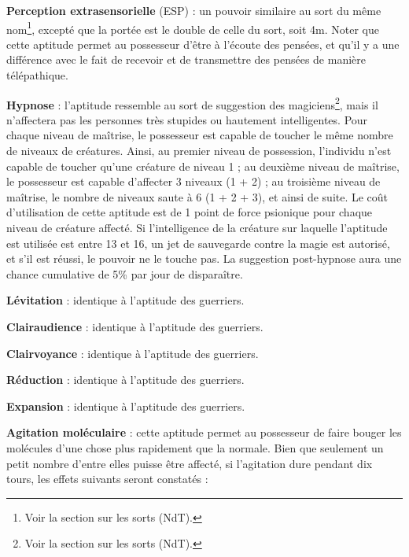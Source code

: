 \documentclass[11pt]{article}
\begin{document}
{\bigskip

\textbf{Perception extrasensorielle} (ESP) : un pouvoir similaire au sort du même nom\footnote{Voir la section sur les sorts (NdT).}, excepté que la portée est le double de celle du sort, soit 4m. Noter que cette aptitude permet au possesseur d'être \og à l'écoute \fg{} des pensées, et qu'il y a une différence avec le fait de recevoir et de transmettre des pensées de manière télépathique.

\bigskip

\textbf{Hypnose} : l'aptitude ressemble au sort de suggestion des magiciens\footnote{Voir la section sur les sorts (NdT).}, mais il n'affectera pas les personnes très stupides ou hautement intelligentes. Pour chaque niveau de maîtrise, le possesseur est capable de toucher le même nombre de niveaux de créatures. Ainsi, au premier niveau de possession, l'individu n'est capable de toucher qu'une créature de niveau 1 ; au deuxième niveau de maîtrise, le possesseur est capable d'affecter 3 niveaux (1 + 2) ; au troisième niveau de maîtrise, le nombre de niveaux saute à 6 (1 + 2 + 3), et ainsi de suite. Le coût d'utilisation de cette aptitude est de 1 point de force psionique pour chaque niveau de créature affecté. Si l'intelligence de la créature sur laquelle l'aptitude est utilisée est entre 13 et 16, un jet de sauvegarde contre la magie est autorisé, et s'il est réussi, le pouvoir ne le touche pas. La suggestion post-hypnose aura  une chance cumulative de 5\% par jour de disparaître.

\bigskip

\textbf{Lévitation} : identique à l'aptitude des guerriers.

\bigskip

\textbf{Clairaudience} : identique à l'aptitude des guerriers.

\bigskip

\textbf{Clairvoyance} : identique à l'aptitude des guerriers.

\bigskip

\textbf{Réduction} : identique à l'aptitude des guerriers.

\bigskip

\textbf{Expansion} : identique à l'aptitude des guerriers.

\bigskip

\textbf{Agitation moléculaire} : cette aptitude permet au possesseur de faire bouger les molécules d'une chose plus rapidement que la normale. Bien que seulement un petit nombre d'entre elles puisse être affecté, si l'agitation dure pendant dix tours, les effets suivants seront constatés :

}
\end{document}
